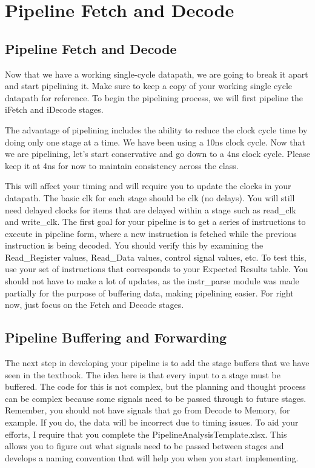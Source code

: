 \chapter{Pipeline Fetch and Decode}


\section{Pipeline Fetch and Decode}
Now that we have a working single-cycle datapath, we are going to break it apart and start pipelining it.  Make sure to keep a copy of your working single cycle datapath for reference.  To begin the pipelining process, we will first pipeline the iFetch and iDecode stages.

The advantage of pipelining includes the ability to reduce the clock cycle time by doing only one stage at a time.  We have been using a 10ns clock cycle.  Now that we are pipelining, let's start conservative and go down to a 4ns clock cycle.  Please keep it at 4ns for now to maintain consistency across the class.  

This will affect your timing and will require you to update the clocks in your datapath.  The basic clk for each stage should be clk (no delays).  You will still need delayed clocks for items that are delayed within a stage such as read\_clk and write\_clk.  The first goal for your pipeline is to get a series of instructions to execute in pipeline form, where a new instruction is fetched while the previous instruction is being decoded.  You should verify this by examining the Read\_Register values, Read\_Data values, control signal values, etc.  To test this, use your set of instructions that corresponds to your Expected Results table.  You should not have to make a lot of updates, as the instr\_parse module was made partially for the purpose of buffering data, making pipelining easier.  For right now, just focus on the Fetch and Decode stages.

\section{Pipeline Buffering and Forwarding}
The next step in developing your pipeline is to add the stage buffers that we have seen in the textbook.  The idea here is that every input to a stage must be buffered.  The code for this is not complex, but the planning and thought process can be complex because some signals need to be passed through to future stages.  Remember, you should not have signals that go from Decode to Memory, for example.  If you do, the data will be incorrect due to timing issues.  To aid your efforts, I require that you complete the PipelineAnalysisTemplate.xlsx.  This allows you to figure out what signals need to be passed between stages and develops a naming convention that will help you when you start implementing. 

